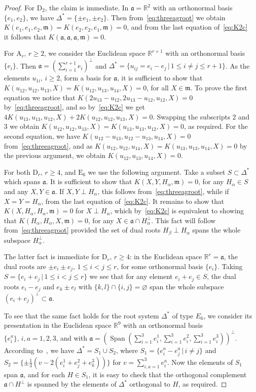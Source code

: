 \documentclass[10pt,a4paper]{amsart}
\renewcommand \a{\alpha}
\newcommand \br{\mathbb{R}}
\newcommand \Span{\operatorname{Span}}
\newcommand\ag{\mathfrak a}
\newcommand\m{\mathfrak m}
\newcommand \<{\langle}
\renewcommand \>{\rangle}
\begin{document}
\begin{proof}
For $\mathrm{D}_2$, the claim is immediate. In $\ag = \br^2$ with an orthonormal basis $\{e_1,e_2\}$, we have $\Delta^* = \{\pm e_1, \pm e_2\}$. Then from~\eqref{eq:threeagroot} we obtain $K(e_1,e_1,e_2,\m) = K(e_2,e_2,e_1,\m) = 0$, and from the last equation of~\eqref{eq:K2c} it follows that $K(\ag,\ag,\ag,\m) = 0$.

For $\mathrm{A}_r, \, r \ge 2$, we consider the Euclidean space $\br^{r+1}$ with an orthonormal basis $\{e_i\}$. Then $\ag = (\sum_{i=1}^{r+1}e_i)^\perp$ and $\Delta^* = \{u_{ij} = e_i-e_j \, | \, 1 \le i \ne j \le r+1\}$. As the elements $u_{1i}, \, i \ge 2$, form a basis for $\ag$, it is sufficient to show that $K(u_{12},u_{12},u_{13},X) = K(u_{12},u_{13},u_{14},X)= 0$, for all $X \in \m$. To prove the first equation we notice that $K(2u_{13}-u_{12},2u_{13}-u_{12},u_{12},X) = 0$ by~\eqref{eq:threeagroot}, and so by~\eqref{eq:K2c} we get $4K(u_{13},u_{13},u_{12},X) + 2K(u_{12},u_{12},u_{13},X) = 0$. Swapping the subscripts $2$ and $3$ we obtain $K(u_{12},u_{12},u_{13},X) = K(u_{13},u_{13},u_{12},X) = 0$, as required. For the second equation, we have $K(u_{12}-u_{13}, u_{12}-u_{13}, u_{14},X) = 0$ from~\eqref{eq:threeagroot}, and as $K(u_{12}, u_{12}, u_{14},X) = K(u_{13}, u_{13}, u_{14},X) = 0$ by the previous argument, we obtain $K(u_{12},u_{13},u_{14},X)= 0$.

For both $\mathrm{D}_r, \, r \ge 4$, and $\mathrm{E}_6$ we use the following argument. Take a subset $S \subset \Delta^*$ which spans $\ag$. It is sufficient to show that $K(X,Y,H_\a,\m) = 0$, for any $H_\a \in S$ and any $X, Y \in \ag$. If $X, Y \perp H_\a$, this follows from~\eqref{eq:threeagroot}, while if $X=Y=H_\a$, from the last equation of~\eqref{eq:K2c}. It remains to show that $K(X,H_\a,H_\a,\m) = 0$ for $X \perp H_\a$, which by~\eqref{eq:K2c} is equivalent to showing that $K(H_\a,H_\a,X,\m) = 0$, for any $X  \in \ag \cap H_\a^\perp$. This fact will follow from~\eqref{eq:threeagroot} provided the set of dual roots $H_\beta \perp H_\a$ spans the whole subspace $H_\a^\perp$.

The latter fact is immediate for $\mathrm{D}_r, \, r \ge 4$: in the Euclidean space $\br^r = \ag$, the dual roots are $\pm e_i \pm e_j,\, 1 \le i < j \le r$, for some orthonormal basis $\{e_i\}$. Taking $S = \{e_i+e_j \, | \, 1 \le i < j \le r\}$ we see that for any element $e_i + e_j \in S$, the dual roots $e_i-e_j$ and $e_k \pm e_l$ with $\{k,l\} \cap \{i,j\} = \varnothing$ span the whole subspace $(e_i+e_j)^\perp \subset \ag$.

To see that the same fact holds for the root system $\Delta^*$ of type $E_6$, we consider its presentation in the Euclidean space $\br^9$ with an orthonormal basis $\{e_i^a\},\, i, a = 1,2,3$, and with $\ag = (\Span(\sum_{i=1}^{3}e_i^1, \sum_{i=1}^{3}e_i^2, \sum_{i=1}^{3}e_i^3))^\perp$. According to~\cite{VdJ}, we have $\Delta^* = S_1 \cup S_2$, where $S_1=\{e_i^a-e_j^a \,| \, i \ne j\}$ and $S_2=\{\pm \frac13 (v-2(e_i^1+e_j^2+e_k^3))\}$ for $v=\sum_{i,a=1}^{3}e_i^a$. Now the elements of $S_1$ span $\ag$, and for each $H \in S_1$, it is easy to check that the orthogonal complement $\ag \cap H^\perp$ is spanned by the elements of $\Delta^*$ orthogonal to $H$, as required.
	\end{proof}
	
\end{document}

